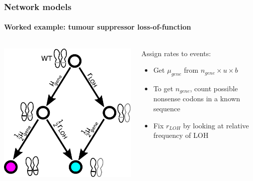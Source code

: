 \documentclass{beamer}
\begin{document}
\begin{frame}
    \frametitle{Network models}
    \framesubtitle{Worked example: tumour suppressor loss-of-function}
    \begin{columns}
        \begin{column}{0.5\textwidth}
        \includegraphics[width=\textwidth]{figures/diagram4c}
        \end{column}
        \begin{column}{0.5\textwidth}
            Assign rates to events:
        \begin{itemize}
            \item Get $\mu_{gene}$ from $n_{gene} \times u \times b$
            \item To get $n_{gene}$, count possible nonsense codons in a
            known sequence
            \item Fix $r_{LOH}$ by looking at relative frequency of LOH
        \end{itemize}
        \end{column}
    \end{columns}
\end{frame}
\end{document}
